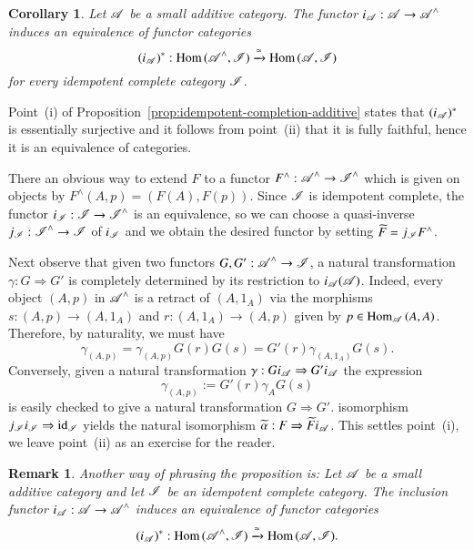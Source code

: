 \documentclass[1p]{elsarticle}
\makeatletter
\renewenvironment{proof}[1][\proofname]{\par
  \pushQED{\qed}%
  \normalfont \topsep6\p@\@plus6\p@\relax
  \trivlist
  \item[\hskip\labelsep
        \scshape
    #1\@addpunct{.}]\ignorespaces
}{%
  \popQED\endtrivlist\@endpefalse
}
\theoremstyle{mythm}
\newtheorem{Cor}[Thm]{Corollary}
\theoremstyle{mydef}
\newtheorem{Rem}[Thm]{Remark}
\makeatother
\begin{document}
\begin{Cor}
  \label{cor:ic-equiv-fctr-cat}
  Let $\operatorname{\mathscr{A}}$ be a small additive category. The functor $i_{\operatorname{\mathscr{A}}}:
  \operatorname{\mathscr{A}} \to \operatorname{\mathscr{A}}^{\wedge}$ induces an equivalence of functor
  categories
  \[
  (i_{\operatorname{\mathscr{A}}})^{\ast}: \operatorname{Hom}{(\operatorname{\mathscr{A}}^{\wedge},\operatorname{\mathscr{I}})} 
  \xrightarrow{\simeq}
  \operatorname{Hom}{(\operatorname{\mathscr{A}},\operatorname{\mathscr{I}})}
  \]
  for every idempotent complete category $\operatorname{\mathscr{I}}$.
\end{Cor}
\begin{proof}
  Point~(i) of Proposition~\ref{prop:idempotent-completion-additive}
  states that $(i_{\operatorname{\mathscr{A}}})^{\ast}$ is essentially surjective and
  it follows from point~(ii) that it is fully faithful, hence it is an
  equivalence of categories.
\end{proof}
\begin{proof}
  There an obvious way to extend $F$ to a functor
  $F^{\wedge}: \operatorname{\mathscr{A}}^{\wedge} \to \operatorname{\mathscr{I}}^{\wedge}$ which is given on
  objects by $F^{\wedge}(A,p) = (F(A),F(p))$.
  Since $\operatorname{\mathscr{I}}$ is
  idempotent complete, the functor $i_{\operatorname{\mathscr{I}}}:\operatorname{\mathscr{I}} \to \operatorname{\mathscr{I}}^{\wedge}$ is an
  equivalence, so we can choose a quasi-inverse
  $j_{\operatorname{\mathscr{I}}}:\operatorname{\mathscr{I}}^{\wedge} \to \operatorname{\mathscr{I}}$ of $i_{\operatorname{\mathscr{I}}}$ 
  and we obtain the desired functor
  by setting $\widetilde{F} = j_{\operatorname{\mathscr{I}}} F^{\wedge}$.
  
  Next observe that given two functors $G,G': \operatorname{\mathscr{A}}^{\wedge} \to
  \operatorname{\mathscr{I}}$, a natural transformation $\gamma: G \Rightarrow G'$ is
  completely determined by its restriction to
  $i_{\operatorname{\mathscr{A}}}{(\operatorname{\mathscr{A}})}$. Indeed, every object $(A,p)$ in
  $\operatorname{\mathscr{A}}^{\wedge}$ is a retract of $(A, 1_{A})$ via the morphisms
  $s:(A,p) \to (A,1_{A})$ and $r:(A,1_{A}) \to (A,p)$ given by 
  $p \in \operatorname{Hom}_{\operatorname{\mathscr{A}}}{(A,A)}$. Therefore, by naturality, we must have
  \[
  \gamma_{(A,p)} = \gamma_{(A,p)} G(r) G(s) = G'(r) \gamma_{(A,1_{A})} G(s).
  \]
  Conversely, given a natural transformation $\gamma: Gi_{\operatorname{\mathscr{A}}}
  \Rightarrow G'i_{\operatorname{\mathscr{A}}}$ the expression
  \[
  \gamma_{(A,p)} := G'(r) \gamma_{A} G(s)
  \]
  is easily checked to give a natural transformation $G \Rightarrow G'$.
  isomorphism $j_{\operatorname{\mathscr{I}}} i_{\operatorname{\mathscr{I}}} \Rightarrow \operatorname{id}_{\operatorname{\mathscr{I}}}$ yields the
  natural isomorphism 
  $\widetilde{\alpha}: F  \Rightarrow  \widetilde{F}i_{\operatorname{\mathscr{A}}}$. 
  This settles point~(i), we leave point~(ii) as an exercise for the reader.
\end{proof}

\begin{Rem}
  \label{rem:idemp-2-adjunction}
  Another way of phrasing the proposition is: Let $\operatorname{\mathscr{A}}$ be a small
  additive category and let  $\operatorname{\mathscr{I}}$ be an idempotent complete
  category. The inclusion functor $i_{\operatorname{\mathscr{A}}}: \operatorname{\mathscr{A}} \to
  \operatorname{\mathscr{A}}^{\wedge}$ induces an equivalence of functor categories 
  \[
  (i_{\operatorname{\mathscr{A}}})^{\ast} : \operatorname{Hom}{(\operatorname{\mathscr{A}}^{\wedge}, \operatorname{\mathscr{I}})} \xrightarrow{\simeq}
  \operatorname{Hom}{(\operatorname{\mathscr{A}}, \operatorname{\mathscr{I}})}.
  \]
\end{Rem}
\fi
\end{document}
